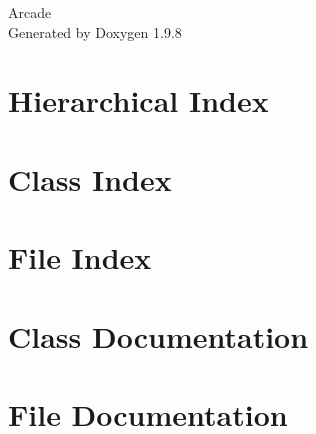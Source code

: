 \documentclass[twoside]{book}
\newcommand{\+}{\discretionary{\mbox{\scriptsize$\hookleftarrow$}}{}{}}
\newcommand{\clearemptydoublepage}{%
    \newpage{\pagestyle{empty}\cleardoublepage}%
  }
\begin{document}
  \raggedbottom
    \hypersetup{pageanchor=false,
                bookmarksnumbered=true,
                pdfencoding=unicode
               }
  \begin{titlepage}
  \vspace*{7cm}
  \begin{center}%
  {\Large Arcade}\\
  \vspace*{1cm}
  {\large Generated by Doxygen 1.9.8}\\
  \end{center}
  \end{titlepage}
  \clearemptydoublepage
  \tableofcontents
  \clearemptydoublepage
  \hypersetup{pageanchor=true}
\chapter{Hierarchical Index}

\chapter{Class Index}

\chapter{File Index}

\chapter{Class Documentation}








\chapter{File Documentation}








  \backmatter
  \newpage
  \clearemptydoublepage
  \printindex
\end{document}
